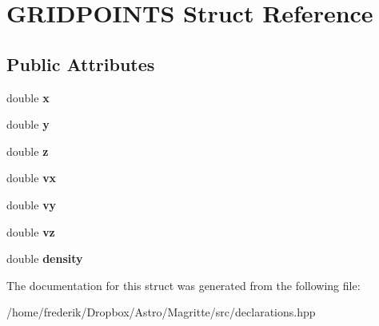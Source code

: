 \hypertarget{structCELLS}{}\section{G\+R\+I\+D\+P\+O\+I\+N\+TS Struct Reference}
\label{structCELLS}
\subsection*{Public Attributes}
\begin{DoxyCompactItemize}
\item 
\mbox{\label{structCELLS_ab005c20b4eba17ad175e7249f100e3f3}} 
double {\bfseries x}
\item 
\mbox{\label{structCELLS_ae84ca528c2164162fd2578b7adc13ee1}} 
double {\bfseries y}
\item 
\mbox{\label{structCELLS_adee58697816208b8133b396a5dbec0cf}} 
double {\bfseries z}
\item 
\mbox{\label{structCELLS_a9a394b27d37551671aa45017aa3cfe16}} 
double {\bfseries vx}
\item 
\mbox{\label{structCELLS_aa5a77adddddbfcb246b6ed19f632de1f}} 
double {\bfseries vy}
\item 
\mbox{\label{structCELLS_a56cc85d1c044bf545e305ef16746c86e}} 
double {\bfseries vz}
\item 
\mbox{\label{structCELLS_aaf9d93b969570fc5181ba79234b3042d}} 
double {\bfseries density}
\end{DoxyCompactItemize}


The documentation for this struct was generated from the following file\+:\begin{DoxyCompactItemize}
\item 
/home/frederik/\+Dropbox/\+Astro/\+Magritte/src/declarations.\+hpp\end{DoxyCompactItemize}
